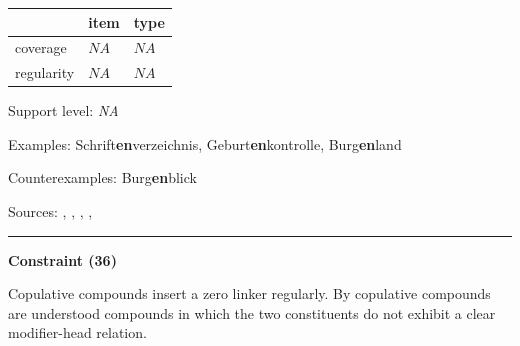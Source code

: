 \vspace{-0.25em}

\begin{table}[!ht]
\begin{center}
\setlength{\extrarowheight}{1pt}
\begin{tabularx}{\columnwidth}{|X|X|X|}
\hline
 & item & type \\
\hline
 coverage & $NA$ & $NA$ \\
\hline
 regularity & $NA$ & $NA$ \\
\hline
\end{tabularx}
\end{center}
\end{table}

\vspace{-1.35em}

\noindent
Support level: \textit{NA}

\vspace{0.3em}

\noindent
Examples: Schrift\textbf{en}verzeichnis, Geburt\textbf{en}kontrolle, Burg\textbf{en}land

\noindent
Counterexamples: Burg\textbf{en}blick

\vspace{0.3em}

\noindent
Sources: \citet[229]{eisenberg_2013}, \citet[3]{nuebling_szczepaniak_2008}, \citet[80]{nuebling_szczepaniak_2013}, \citet[110]{ortner_mueller-bollhagen_1991}, \citet[29]{schaefer_2018}

\vspace{0.35em}
\hrule




\vspace{0.4em}

\begin{center}
\textbf{Constraint (36)}
\end{center}

\noindent
Copulative compounds insert a zero linker regularly. By copulative compounds are understood compounds in which the two constituents do not exhibit a clear modifier-head relation.
\vspace{0.5em}



